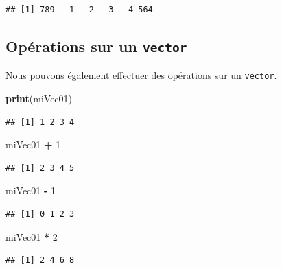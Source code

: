 \documentclass[
]{book}
\newenvironment{Shaded}{\begin{snugshade}}{\end{snugshade}}
\newcommand{\DecValTok}[1]{\textcolor[rgb]{0.00,0.00,0.81}{#1}}
\newcommand{\KeywordTok}[1]{\textcolor[rgb]{0.13,0.29,0.53}{\textbf{#1}}}
\newcommand{\NormalTok}[1]{#1}
\newcommand{\OperatorTok}[1]{\textcolor[rgb]{0.81,0.36,0.00}{\textbf{#1}}}
\newcommand{\StringTok}[1]{\textcolor[rgb]{0.31,0.60,0.02}{#1}}
\begin{document}
\begin{verbatim}
## [1] 789   1   2   3   4 564
\end{verbatim}

\hypertarget{opuxe9rations-sur-un-vector}{%
\subsection{\texorpdfstring{Opérations sur un \texttt{vector}}{Opérations sur un vector}}\label{opuxe9rations-sur-un-vector}}

Nous pouvons également effectuer des opérations sur un \texttt{vector}.

\begin{Shaded}
\begin{Highlighting}[]
\KeywordTok{print}\NormalTok{(miVec01)}
\end{Highlighting}
\end{Shaded}

\begin{verbatim}
## [1] 1 2 3 4
\end{verbatim}

\begin{Shaded}
\begin{Highlighting}[]
\NormalTok{miVec01 }\OperatorTok{+}\StringTok{ }\DecValTok{1}
\end{Highlighting}
\end{Shaded}

\begin{verbatim}
## [1] 2 3 4 5
\end{verbatim}

\begin{Shaded}
\begin{Highlighting}[]
\NormalTok{miVec01 }\OperatorTok{-}\StringTok{ }\DecValTok{1}
\end{Highlighting}
\end{Shaded}

\begin{verbatim}
## [1] 0 1 2 3
\end{verbatim}

\begin{Shaded}
\begin{Highlighting}[]
\NormalTok{miVec01 }\OperatorTok{*}\StringTok{ }\DecValTok{2}
\end{Highlighting}
\end{Shaded}

\begin{verbatim}
## [1] 2 4 6 8
\end{verbatim}
\end{document}
